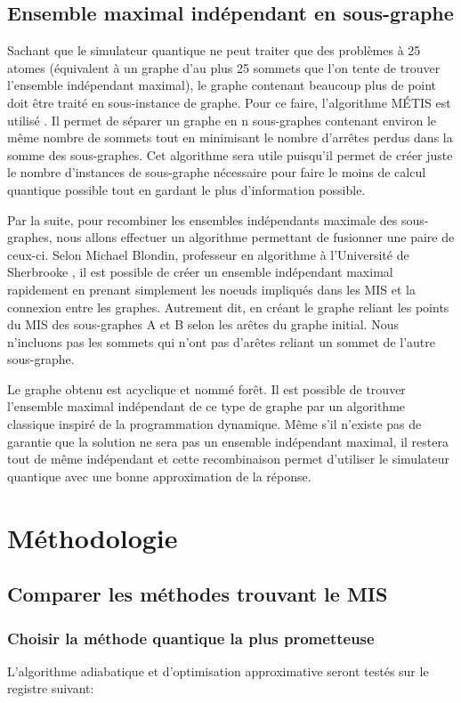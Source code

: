 \documentclass[11pt]{article}
\begin{document}
\subsection{Ensemble maximal indépendant en sous-graphe}
Sachant que le simulateur quantique ne peut traiter que des problèmes à 25 atomes (équivalent à un graphe d'au plus 25 sommets que l'on tente de trouver l'ensemble indépendant maximal), le graphe contenant beaucoup plus de point doit être traité en sous-instance de graphe. Pour ce faire, l'algorithme MÉTIS  est utilisé \cite{karypis_multilevelk-way_1998}. Il permet de séparer un graphe en n sous-graphes contenant environ le même nombre de sommets tout en minimisant le nombre d'arrêtes perdus dans la somme des sous-graphes. Cet algorithme sera utile puisqu'il permet de créer juste le nombre d'instances de sous-graphe nécessaire pour faire le moins de calcul quantique possible tout en gardant le plus d'information possible. 

Par la suite, pour recombiner les ensembles indépendants maximale des sous-graphes, nous allons effectuer un algorithme permettant de fusionner une paire de ceux-ci. Selon Michael Blondin, professeur en algorithme à l'Université de Sherbrooke \cite{blondin_entretien_2024}, il est possible de créer un ensemble indépendant maximal rapidement en prenant simplement les noeuds impliqués dans les MIS et la connexion entre les graphes. Autrement dit, en créant le graphe reliant les points du MIS des sous-graphes A et B selon les arêtes du graphe initial. Nous n'incluons pas les sommets qui n'ont pas d'arêtes reliant un sommet de l'autre sous-graphe.

Le graphe obtenu est acyclique et nommé forêt. Il est possible de trouver l'ensemble maximal indépendant de ce type de graphe par un algorithme classique inspiré de la programmation dynamique. Même s'il n'existe pas de garantie que la solution ne sera pas un ensemble indépendant maximal, il restera tout de même indépendant et cette recombinaison permet d'utiliser le simulateur quantique avec une bonne approximation de la réponse.

\section{Méthodologie}

\subsection{Comparer les méthodes trouvant le MIS}
\subsubsection{Choisir la méthode quantique la plus prometteuse}
L'algorithme adiabatique et d'optimisation approximative seront testés sur le registre suivant: 
\end{document}
